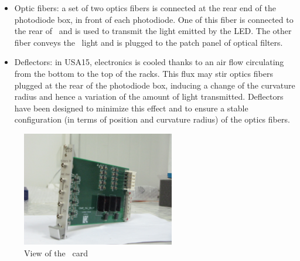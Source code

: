\begin{itemize}
\item Optic fibers: a set of two optics fibers is connected at the rear end of the photodiode box, in front of each photodiode. One of this fiber is connected to the rear of \phocal~and is used to transmit the light emitted by the LED. The other fiber conveys the \laser~light and is plugged to the patch panel of optical filters. 
\item Deflectors: in USA15, electronics is cooled thanks to an air flow circulating from the bottom to the top of the racks. This flux may stir optics fibers plugged at the rear of the photodiode box, inducing a change of the curvature radius and hence a variation of the amount of light transmitted. Deflectors have been designed to minimize this effect and to ensure a stable configuration (in terms of position and curvature radius) of the optics fibers.
\end{itemize}

\begin{figure}[htbp]
\centering
\includegraphics[height=5cm]{figures/cis.JPG}
\caption{View of the  \charinjsplit~card}\label{fig:lascis}
\end{figure}
